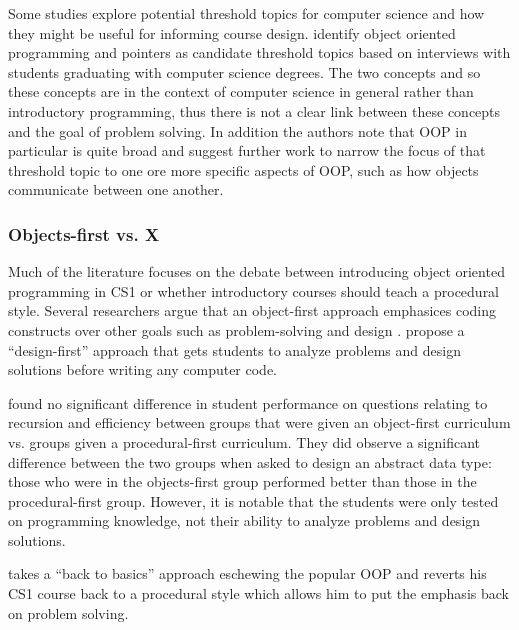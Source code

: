 \documentclass[12pt]{article}
\let\textcite=\autocite
\begin{document}
Some studies explore potential threshold
topics\autocite{meyer_threshold_2005} for computer science and how
they might be useful for informing course
design\autocite{mccartney_liminal_2009,boustedt_threshold_2007}. \citeauthor{boustedt_threshold_2007}
identify object oriented programming and pointers as candidate
threshold topics based on interviews with students graduating with
computer science degrees. The two concepts and so these concepts are
in the context of computer science in general rather than introductory
programming, thus there is not a clear link between these concepts and
the goal of problem solving. In addition the authors note that OOP in
particular is quite broad and suggest further work to narrow the focus
of that threshold topic to one ore more specific aspects of OOP, such
as how objects communicate between one another.

\subsubsection{Objects-first vs. X}
Much of the literature focuses on the debate between introducing
object oriented programming in CS1 or whether introductory courses
should teach a procedural style. Several researchers argue that an
object-first approach emphasices coding constructs over other goals
such as problem-solving and design
\autocite{moritz_objectsfirst_2005,muller_guidelines_2005,reges_back_2006}. \textcite{moritz_objectsfirst_2005}
propose a “design-first” approach that gets students to analyze
problems and design solutions before writing any computer code.

\autocite{vilner_fundamental_2007} found no significant difference in
student performance on questions relating to recursion and efficiency
between groups that were given an object-first curriculum vs. groups
given a procedural-first curriculum. They did observe a significant
difference between the two groups when asked to design an abstract
data type: those who were in the objects-first group performed better
than those in the procedural-first group. However, it is notable that
the students were only tested on programming knowledge, not their
ability to analyze problems and design solutions.

\textcite{reges_back_2006} takes a ``back to basics'' approach eschewing
the popular OOP and reverts his CS1 course back to a procedural style
which allows him to put the emphasis back on problem solving.

\vspace{4\baselineskip}\vspace{-\parskip} %

\printbibliography
\end{document}
